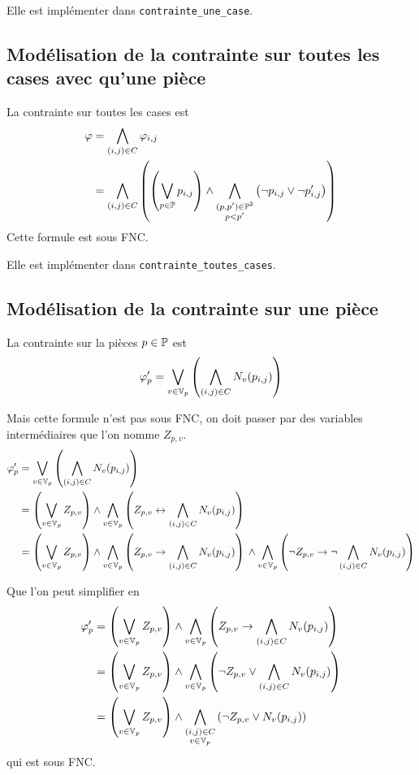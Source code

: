 Elle est implémenter dans \verb|contrainte_une_case|.

\subsection{Modélisation de la contrainte sur toutes les cases avec qu'une pièce}
La contrainte sur toutes les cases est
\begin{align*}
    \varphi &= \bigwedge_{(i,j)\in C} \varphi_{i,j} \\
            &= \bigwedge_{(i,j)\in C} \left(\left(\bigvee_{p\in\mathbb{P}} p_{i,j} \right) \land
               \bigwedge_{\substack{(p,p')\in\mathbb{P}^2\\p<p'}}\left(\lnot p_{i,j} \lor \lnot p'_{i,j}\right)\right)
\end{align*}
Cette formule est sous FNC.

Elle est implémenter dans \verb|contrainte_toutes_cases|.

\subsection{Modélisation de la contrainte sur une pièce}
La contrainte sur la pièces $p\in\mathbb{P}$ est
\begin{equation*}
    \varphi'_p = \bigvee_{v\in\mathbb{V}_p} \left( \bigwedge_{(i,j)\in C} N_v(p_{i,j}) \right)
\end{equation*}

Mais cette formule n'est pas sous FNC, on doit passer par des variables
intermédiaires que l'on nomme $Z_{p,v}$.
\begin{align*}
    \varphi'_p &= \bigvee_{v\in\mathbb{V}_p} \left( \bigwedge_{(i,j)\in C} N_v(p_{i,j}) \right)\\
               &= \left( \bigvee_{v\in\mathbb{V}_p} Z_{p,v} \right)
                  \land \bigwedge_{v\in\mathbb{V}_p} \left(Z_{p,v} \leftrightarrow \bigwedge_{(i,j)\in C} N_v(p_{i,j}) \right)\\
               &= \left( \bigvee_{v\in\mathbb{V}_p} Z_{p,v} \right)
                  \land \bigwedge_{v\in\mathbb{V}_p} \left(Z_{p,v} \to \bigwedge_{(i,j)\in C} N_v(p_{i,j}) \right){}
                  \land \bigwedge_{v\in\mathbb{V}_p} \left(\lnot Z_{p,v} \to \lnot\bigwedge_{(i,j)\in C} N_v(p_{i,j}) \right)\\
\end{align*}

Que l'on peut simplifier en
\begin{align*}
    \varphi'_p &= \left( \bigvee_{v\in\mathbb{V}_p} Z_{p,v} \right)
                  \land \bigwedge_{v\in\mathbb{V}_p} \left(Z_{p,v} \to \bigwedge_{(i,j)\in C} N_v(p_{i,j}) \right)\\
               &= \left( \bigvee_{v\in\mathbb{V}_p} Z_{p,v} \right)
                  \land \bigwedge_{v\in\mathbb{V}_p} \left(\lnot Z_{p,v} \lor \bigwedge_{(i,j)\in C} N_v(p_{i,j}) \right)\\
               &= \left( \bigvee_{v\in\mathbb{V}_p} Z_{p,v} \right)
                  \land \bigwedge_{\substack{(i,j)\in C\\v\in\mathbb{V}_p}} \left(\lnot Z_{p,v} \lor N_v(p_{i,j}) \right)\\
\end{align*}
qui est sous FNC.

